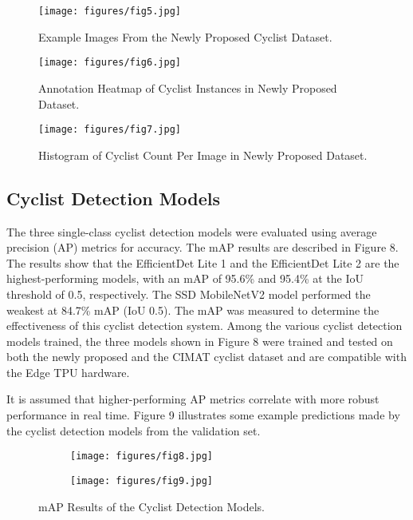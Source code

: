 \documentclass{article}
\begin{document}
\begin{figure}[b]
\centering
\texttt{[image: figures/fig5.jpg]}
\caption{Example Images From the Newly Proposed Cyclist Dataset.}
\label{fig:fig5}
\end{figure}

\begin{figure}[t]
\centering
\texttt{[image: figures/fig6.jpg]}
\caption{Annotation Heatmap of Cyclist Instances in Newly Proposed Dataset.}
\label{fig:fig6}
\end{figure}

\begin{figure}[t]
\centering
\texttt{[image: figures/fig7.jpg]}
\caption{Histogram of Cyclist Count Per Image in Newly Proposed Dataset.}
\label{fig:fig7}
\end{figure}

\subsection{Cyclist Detection Models}
The three single-class cyclist detection models were evaluated using average precision (AP) metrics for accuracy. The mAP results are described in Figure 8. The results show that the EfficientDet Lite 1 and the EfficientDet Lite 2 are the highest-performing models, with an mAP of 95.6\% and 95.4\% at the IoU threshold of 0.5, respectively. The SSD MobileNetV2 model performed the weakest at 84.7\% mAP (IoU 0.5). The mAP was measured to determine the effectiveness of this cyclist detection system. Among the various cyclist detection models trained, the three models shown in Figure 8 were trained and tested on both the newly proposed and the CIMAT cyclist dataset and are compatible with the Edge TPU hardware. 

It is assumed that higher-performing AP metrics correlate with more robust performance in real time. Figure 9 illustrates some example predictions made by the cyclist detection models from the validation set. 

\begin{figure}[t]
\begin{subfigure}[t]{0.5\textwidth}
\centering
\texttt{[image: figures/fig8.jpg]}
\end{subfigure} \begin{subfigure}[t]{0.5\textwidth}
\centering
\texttt{[image: figures/fig9.jpg]}
\end{subfigure}
\caption{mAP Results of the Cyclist Detection Models.}
\label{fig:fig8}
\end{figure}
\end{document}
